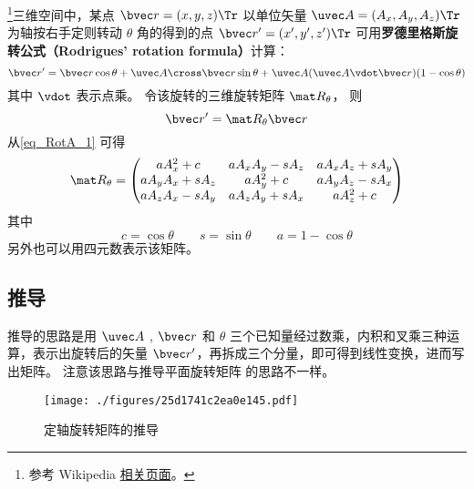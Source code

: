 

\footnote{参考 Wikipedia \href{https://en.wikipedia.org/wiki/Rodrigues'_rotation_formula}{相关页面}。}三维空间中，某点 $\bvec r=(x,y,z)\Tr$ 以单位矢量 $\uvec A=(A_x, A_y, A_z)\Tr$ 为轴按右手定则转动 $\theta$ 角的得到的点 $\bvec r'=(x',y',z')\Tr$ 可用\textbf{罗德里格斯旋转公式（Rodrigues' rotation formula）}计算：
\begin{equation}\label{eq_RotA_1}
\bvec r' = \bvec r \cos\theta + \uvec A \cross \bvec r \sin\theta + \uvec A (\uvec A \vdot \bvec r) (1 - \cos\theta)
\end{equation}
其中 $\vdot$ 表示点乘。 令该旋转的三维旋转矩阵 $\mat R_\theta$， 则
\begin{equation}\label{eq_RotA_2}
\bvec r' = \mat R_\theta \bvec r
\end{equation}
从\autoref{eq_RotA_1} 可得
\begin{equation}\label{eq_RotA_3}
\mat R_\theta =
\begin{pmatrix}
a A_x^2 + c & a A_x A_y - s A_z & a A_x A_z + s A_y\\
a A_y A_x + s A_z & a A_y^2 + c & a A_y A_z - s A_x\\
a A_z A_x - s A_y & a A_z A_y + s A_x & a A_z^2 + c
\end{pmatrix}\end{equation}
其中
\begin{equation}
c = \cos\theta \qquad s = \sin\theta \qquad a = 1 - \cos\theta
\end{equation}
另外也可以用四元数表示该矩阵。

\subsection{推导}
推导的思路是用 $\uvec A$ , $\bvec r$ 和 $\theta $ 三个已知量经过数乘，内积和叉乘三种运算，表示出旋转后的矢量 $\bvec r'$，再拆成三个分量，即可得到线性变换，进而写出矩阵。 注意该思路与推导平面旋转矩阵 的思路不一样。
\begin{figure}[ht]
\centering
\texttt{[image: ./figures/25d1741c2ea0e145.pdf]}
\caption{定轴旋转矩阵的推导} \label{fig_RotA_1}
\end{figure} 

